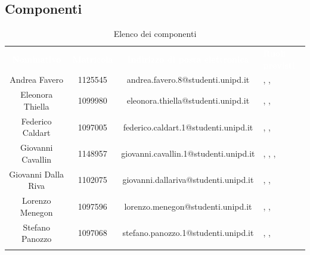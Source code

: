 \subsection{Componenti}
\begin{longtable}{ c  c  c  C{4cm} }
	\textcolor{white}{\textbf{Nominativo}} & \textcolor{white}{\textbf{Matricola}} & \textcolor{white}{\textbf{Indirizzo di posta elettronica}} & \textcolor{white}{\textbf{Ruoli previsti}}\\
	
	Andrea Favero & 1125545 & andrea.favero.8@studenti.unipd.it & \adm, \ana, \ver \\
	
	Eleonora Thiella & 1099980 & eleonora.thiella@studenti.unipd.it & \adm, \ana, \ver \\
	
	Federico Caldart & 1097005 & federico.caldart.1@studenti.unipd.it & \adm, \ana, \ver\\
	
	Giovanni Cavallin & 1148957 & giovanni.cavallin.1@studenti.unipd.it & \RdP, \adm, \ana, \ver\\
	
	Giovanni Dalla Riva & 1102075 & giovanni.dallariva@studenti.unipd.it & \adm, \ana, \ver \\
	
	Lorenzo Menegon & 1097596 & lorenzo.menegon@studenti.unipd.it & \adm, \ana, \ver \\
	
	Stefano Panozzo & 1097068 & stefano.panozzo.1@studenti.unipd.it & \RdP, \ana, \ver\\
	\caption{Elenco dei componenti}\\
\end{longtable}